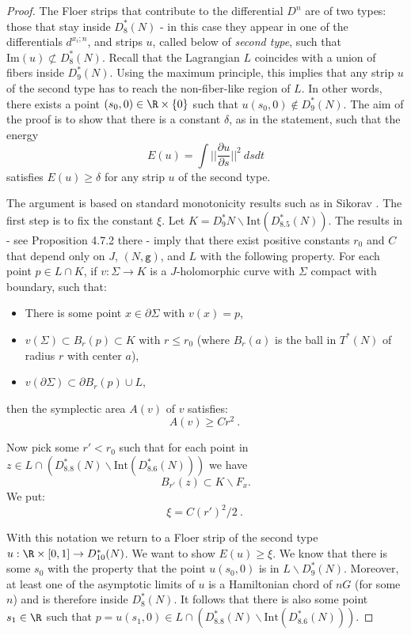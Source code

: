  \begin{proof} The Floer strips that contribute to the differential $D^{n}$ are of two types: 
 those that stay inside $D^{\ast}_{8}(N)$ - in this case they appear in one of the differentials
 $d^{x_{i};n}$, and strips $u$, called below of {\em second type}, such that $\mathrm{Im}(u)\not\subset D^{\ast}_{8}(N)$. Recall that the Lagrangian $L$ coincides with a union of fibers
 inside $D^{\ast}_{9}(N)$. Using the maximum principle,  this implies that 
 any strip $u$ of the second  type has to reach the non-fiber-like region of $L$. In other words, there exists a point $(s_{0},0)\in \R\times\{0\}$ such that $u(s_{0},0)\not\in D^{\ast}_{9}(N)$. 
 The aim of the proof is to show that there is a constant $\delta$, as in the statement, such 
 that the energy
 $$E(u)=\int ||\frac{\partial u}{\partial s}||^{2}\ dsdt $$
 satisfies $E(u)\geq \delta$ for any strip $u$ of the second type.
 
The argument is based on standard monotonicity  results such as in Sikorav \cite{Sik:est}. 
The first step is to fix the constant $\xi$. Let $K= D^{\ast}_{9}N\backslash \mathrm{Int}(D^{\ast}_{8.5}(N))$. The results in  \cite{Sik:est} - see Proposition 4.7.2 there -  imply that there exist positive constants $r_{0}$ and $C$ that depend only on $J$, $(N,\mathtt{g})$, and $L$ with the following property.
For each point $p\in L\cap K$, if $v:\Sigma\to K$  is a
$J$-holomorphic curve with $\Sigma$ compact with boundary, such that:
\begin{itemize}
\item[i.] There is  some point $x\in \partial\Sigma$ with $v(x)=p$,
\item[ii.] $v(\Sigma)\subset B_{r}(p)\subset K$ with $r\leq r_{0}$ (where $B_{r}(a)$ is the ball in $T^{\ast}(N)$ of radius $r$ with center $a$),
\item[iii.] $v(\partial \Sigma)\subset \partial B_{r}(p)\cup L$,
\end{itemize}  
 then the symplectic area $A(v)$ of $v$ satisfies:
 $$A(v)\geq Cr^{2}~.~$$
 
Now pick some $r'<r_{0}$ such that for each point in $z\in L\cap (D^{\ast}_{8.8}(N)\backslash \mathrm{Int}(D^{\ast}_{8.6}(N)))$ we have 
\begin{equation}\label{eq:dep_x}
B_{r'}(z)\subset K\backslash F_{x}.
\end{equation}
 We put:
 $$\xi= C(r')^{2}/2~.~$$
 

 With this notation we return to a Floer strip of the second type $u:\R\times [0,1]\to D^{\ast}_{10}(N)$. We want to show  $E(u)\geq \xi$. We know that there is some $s_{0}$ with the property that the point $u(s_{0},0)$ is in $L\backslash D^{\ast}_{9}(N)$. Moreover, at least one of the asymptotic limits of $u$ is a Hamiltonian chord of $nG$ (for some $n$) and is therefore inside $D^{\ast}_{8}(N)$. It follows that there is also  some point
 $s_{1}\in \R$ such that $p=u(s_{1},0)\in  L\cap (D^{\ast}_{8.8}(N)\backslash \mathrm{Int}(D^{\ast}_{8.6}(N)))$.
 

\end{proof}
